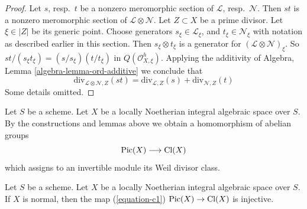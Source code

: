 \begin{proof}
Let $s$, resp.\ $t$ be a nonzero meromorphic section
of $\mathcal{L}$, resp.\ $\mathcal{N}$. Then $st$ is a nonzero
meromorphic section of $\mathcal{L} \otimes \mathcal{N}$.
Let $Z \subset X$ be a prime divisor. Let $\xi \in |Z|$ be its generic
point. Choose generators $s_\xi \in \mathcal{L}_\xi$, and
$t_\xi \in \mathcal{N}_\xi$ with notation as described earlier
in this section. Then $s_\xi \otimes t_\xi$ is a generator
for $(\mathcal{L} \otimes \mathcal{N})_\xi$.
So $st/(s_\xi t_\xi) = (s/s_\xi)(t/t_\xi)$ in
$Q(\mathcal{O}_{X, \xi}^h)$. Applying the additivity of
Algebra, Lemma \ref{algebra-lemma-ord-additive}
we conclude that
$$
\text{div}_{\mathcal{L} \otimes \mathcal{N}, Z}(st)
=
\text{div}_{\mathcal{L}, Z}(s) + \text{div}_{\mathcal{N}, Z}(t)
$$
Some details omitted.
\end{proof}

\noindent
Let $S$ be a scheme. Let $X$ be a locally Noetherian integral algebraic space
over $S$. By the constructions and lemmas above we obtain a homomorphism
of abelian groups
\begin{equation}
\label{equation-c1}
\mathop{\mathrm{Pic}}\nolimits(X) \longrightarrow \text{Cl}(X)
\end{equation}
which assigns to an invertible module its Weil divisor class.

\begin{lemma}
\label{lemma-normal-c1-injective}
Let $S$ be a scheme. Let $X$ be a locally Noetherian integral algebraic space
over $S$. If $X$ is normal, then the map (\ref{equation-c1})
$\mathop{\mathrm{Pic}}\nolimits(X) \to \text{Cl}(X)$ is injective.
\end{lemma}

